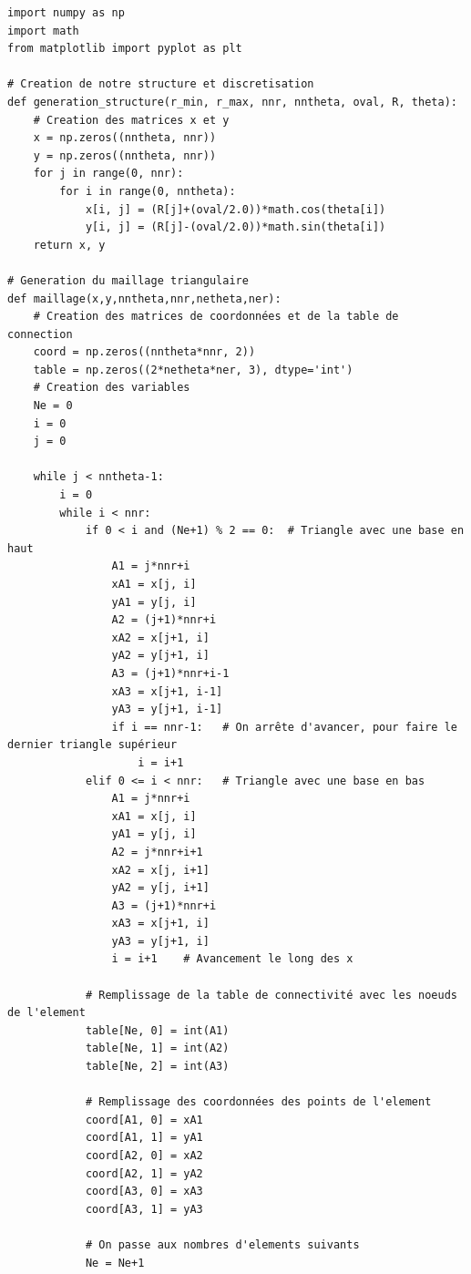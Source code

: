 \documentclass[a4paper,11pt]{report}    %
\newenvironment{longlisting}{\captionsetup{type=listing}}{} %
\begin{document}
\begin{longlisting}
\begin{verbatim}
import numpy as np
import math
from matplotlib import pyplot as plt

# Creation de notre structure et discretisation
def generation_structure(r_min, r_max, nnr, nntheta, oval, R, theta):
    # Creation des matrices x et y
    x = np.zeros((nntheta, nnr))
    y = np.zeros((nntheta, nnr))
    for j in range(0, nnr):
        for i in range(0, nntheta):
            x[i, j] = (R[j]+(oval/2.0))*math.cos(theta[i])
            y[i, j] = (R[j]-(oval/2.0))*math.sin(theta[i])
    return x, y

# Generation du maillage triangulaire
def maillage(x,y,nntheta,nnr,netheta,ner):
    # Creation des matrices de coordonnées et de la table de connection
    coord = np.zeros((nntheta*nnr, 2))
    table = np.zeros((2*netheta*ner, 3), dtype='int')
    # Creation des variables
    Ne = 0
    i = 0
    j = 0

    while j < nntheta-1:
        i = 0
        while i < nnr:
            if 0 < i and (Ne+1) % 2 == 0:  # Triangle avec une base en haut
                A1 = j*nnr+i
                xA1 = x[j, i]
                yA1 = y[j, i]
                A2 = (j+1)*nnr+i
                xA2 = x[j+1, i]
                yA2 = y[j+1, i]
                A3 = (j+1)*nnr+i-1
                xA3 = x[j+1, i-1]
                yA3 = y[j+1, i-1]
                if i == nnr-1:   # On arrête d'avancer, pour faire le dernier triangle supérieur
                    i = i+1
            elif 0 <= i < nnr:   # Triangle avec une base en bas
                A1 = j*nnr+i
                xA1 = x[j, i]
                yA1 = y[j, i]
                A2 = j*nnr+i+1
                xA2 = x[j, i+1]
                yA2 = y[j, i+1]
                A3 = (j+1)*nnr+i
                xA3 = x[j+1, i]
                yA3 = y[j+1, i]
                i = i+1    # Avancement le long des x

            # Remplissage de la table de connectivité avec les noeuds de l'element
            table[Ne, 0] = int(A1)
            table[Ne, 1] = int(A2)
            table[Ne, 2] = int(A3)

            # Remplissage des coordonnées des points de l'element
            coord[A1, 0] = xA1
            coord[A1, 1] = yA1
            coord[A2, 0] = xA2
            coord[A2, 1] = yA2
            coord[A3, 0] = xA3
            coord[A3, 1] = yA3

            # On passe aux nombres d'elements suivants
            Ne = Ne+1


\end{verbatim}
\end{longlisting}
\end{document}

